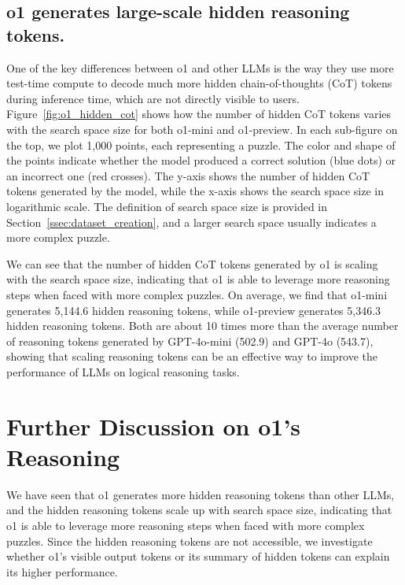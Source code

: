     \subsection{o1 generates large-scale hidden reasoning tokens.}
    \label{app:hidden_cot_analysis}
    One of the key differences between o1 and other LLMs is the way they use more test-time compute to decode much more hidden chain-of-thoughts (CoT) tokens during inference time, which are not directly visible to users.
    Figure~\ref{fig:o1_hidden_cot} shows how the number of hidden CoT tokens varies with the search space size for both o1-mini and o1-preview. 
    In each sub-figure on the top, we plot 1,000 points, each representing a puzzle. 
    The color and shape of the points indicate whether the model produced a correct solution (blue dots) or an incorrect one (red crosses).
    The y-axis shows the number of hidden CoT tokens generated by the model, while the x-axis shows the search space size in logarithmic scale. The definition of search space size is provided in Section~\ref{ssec:dataset_creation}, and a larger search space usually indicates a more complex puzzle. 
    
    
    We can see that the number of hidden CoT tokens generated by o1 is scaling with the search space size, indicating that o1 is able to leverage more reasoning steps when faced with more complex puzzles. 
    On average, we find that o1-mini generates 5,144.6 hidden reasoning tokens, while o1-preview generates 5,346.3 hidden reasoning tokens. Both are about 10 times more than the average number of reasoning tokens generated by GPT-4o-mini (502.9) and GPT-4o (543.7), showing that scaling reasoning tokens can be an effective way to improve the performance of LLMs on logical reasoning tasks.   

\section{Further Discussion on o1's Reasoning}
\label{sec:o1_reason}




We have seen that o1 generates more hidden reasoning tokens than other LLMs, and the hidden reasoning tokens scale up with search space size, indicating that o1 is able to leverage more reasoning steps when faced with more complex puzzles. 
Since the hidden reasoning tokens are not accessible, we investigate whether o1's visible output tokens or its summary of hidden tokens can explain its higher performance.

